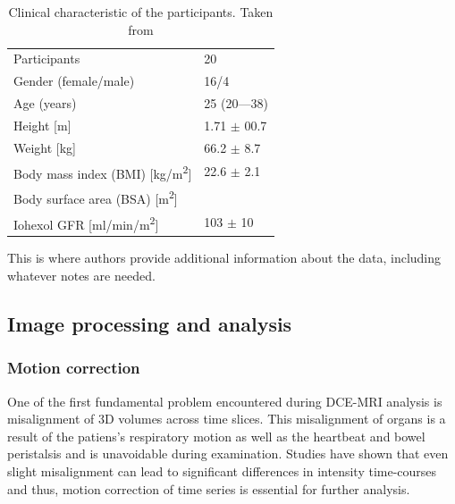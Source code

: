 \begin{table}[h!]
\centering
\caption[Clinical characteristic of the participants]{Clinical characteristic of the participants. Taken from \cite{eikefjord2017dynamic}}
\label{tab:participants}
\begin{threeparttable}
\renewcommand{\arraystretch}{1.25}
\begin{tabular}{m{8cm} m{2.25cm}}
	\hline

 	Participants & 20\\
  	Gender (female/male) &16/4\\
  	Age (years) & 25 (20---38)\\
  	Height [m] & 1.71 $\pm$ 00.7\\
  	Weight [kg] & 66.2 $\pm$ 8.7\\
  	Body mass index (BMI) [kg/m\textsuperscript{2}] & 22.6 $\pm$ 2.1\\
  	Body surface area (BSA) [m\textsuperscript{2}]& \\
  	Iohexol GFR [ml/min/m\textsuperscript{2}] &103 $\pm$ 10\\
  \hline

\end{tabular}
\begin{tablenotes}%
\footnotesize{}%
\item This is where authors provide additional information about the data, including whatever notes are needed.
    \end{tablenotes}
	\end{threeparttable}
\end{table}



\subsection{Image processing and analysis}
\subsubsection{Motion correction}
One of the first fundamental problem encountered during DCE-MRI analysis is misalignment of 3D volumes across time slices. This misalignment of organs is a result of the patiens's respiratory motion as well as the heartbeat and bowel peristalsis and is unavoidable during examination. Studies have shown that even slight misalignment can lead to significant differences in intensity time-courses \cite{KidneySubsegmentation} and thus, motion correction of time series is essential for further analysis.

